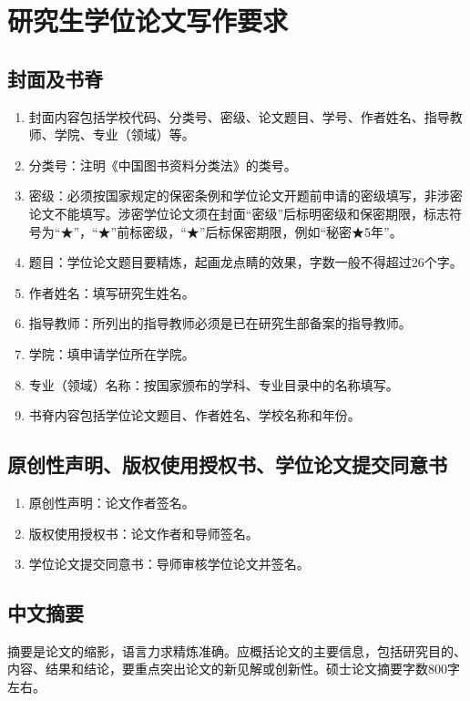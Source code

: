\section{研究生学位论文写作要求}

\subsection{封面及书脊}

\begin{enumerate}
  \item 封面内容包括学校代码、分类号、密级、论文题目、学号、作者姓名、指导教师、学院、专业（领域）等。
  \item 分类号：注明《中国图书资料分类法》的类号。
  \item 密级：必须按国家规定的保密条例和学位论文开题前申请的密级填写，非涉密论文不能填写。涉密学位论文须在封面“密级”后标明密级和保密期限，标志符号为“★”，“★”前标密级，“★”后标保密期限，例如“秘密★5年”。
  \item 题目：学位论文题目要精炼，起画龙点睛的效果，字数一般不得超过26个字。
  \item 作者姓名：填写研究生姓名。
  \item 指导教师：所列出的指导教师必须是已在研究生部备案的指导教师。
  \item 学院：填申请学位所在学院。
  \item 专业（领域）名称：按国家颁布的学科、专业目录中的名称填写。
  \item 书脊内容包括学位论文题目、作者姓名、学校名称和年份。
\end{enumerate}

\subsection{原创性声明、版权使用授权书、学位论文提交同意书}

\begin{enumerate}
  \item 原创性声明：论文作者签名。
  \item 版权使用授权书：论文作者和导师签名。
  \item 学位论文提交同意书：导师审核学位论文并签名。
\end{enumerate}

\subsection{中文摘要}

摘要是论文的缩影，语言力求精炼准确。应概括论文的主要信息，包括研究目的、内容、结果和结论，要重点突出论文的新见解或创新性。硕士论文摘要字数800字左右。

